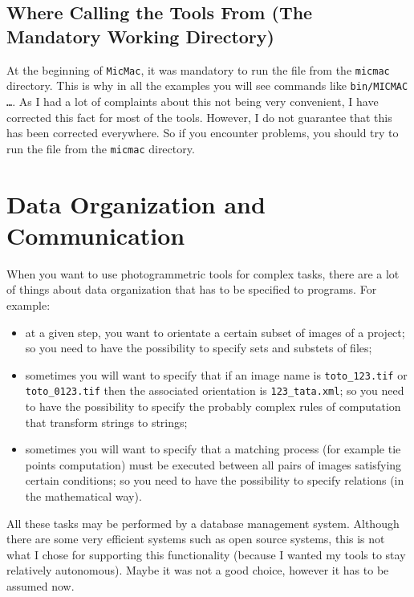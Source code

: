 \subsection{Where Calling the Tools From (The Mandatory Working Directory)}

At the beginning of {\tt MicMac}, it was mandatory to run the file from the
{\tt micmac} directory. This is why in all the examples you will see
commands like {\tt bin/MICMAC \dots}. As I had a lot of complaints
about this not being very convenient, I have corrected this fact for most
of the tools.  However, I do not guarantee that this has been corrected
everywhere. So if you encounter problems,  you should try to run the file
from the {\tt micmac} directory.




\section{Data Organization and Communication}

When you want to use photogrammetric tools for complex tasks, there are a lot
of things about data organization that has to be specified to programs.
For example:

\begin{itemize}
   \item  at  a given step, you want to orientate a certain subset of images of a
          project; so you need  to have the possibility to specify sets
          and substets of files;

   \item  sometimes you will want to specify that if an image name is
          {\tt toto\_123.tif} or  {\tt toto\_0123.tif}  then the associated orientation is
          {\tt 123\_tata.xml}; so you need to have the possibility to specify the probably complex
          rules of computation that transform strings to strings;

   \item  sometimes you will want to specify that a matching process (for example
          tie points computation) must be executed between all pairs of images satisfying
          certain conditions; so  you need to have the possibility to specify relations
          (in the mathematical way).
\end{itemize}
  
All these tasks may be performed by a database management system. Although there
are some very efficient systems such as open source systems, this is not what I chose
for supporting this functionality (because I wanted my tools to stay relatively autonomous).
Maybe it was not a good choice, however it has to be assumed now.


